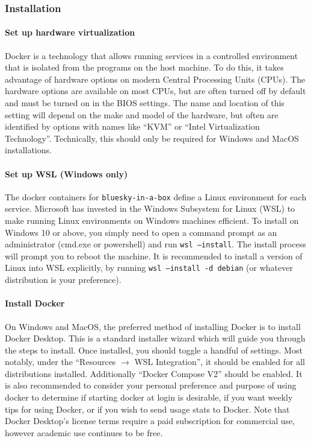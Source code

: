\subsubsection{Installation}
\label{biab-install}

\paragraph{Set up hardware virtualization}

Docker is a technology that allows running services in a controlled environment that is isolated from the programs on the host machine.
To do this, it takes advantage of hardware options on modern Central Processing Units (CPUs).
The hardware options are available on most CPUs, but are often turned off by default and must be turned on in the BIOS settings.
The name and location of this setting will depend on the make and model of the hardware, but often are identified by options with names like ``KVM'' or ``Intel Virtualization Technology''.
Technically, this should only be required for Windows and MacOS installations.

\paragraph{Set up WSL (Windows only)}

The docker containers for \texttt{bluesky-in-a-box} define a Linux\cite{} environment for each service.
Microsoft has invested in the Windows Subsystem for Linux (WSL)\cite{} to make running Linux environments on Windows machines efficient.
To install on Windows 10 or above, you simply need to open a command prompt as an administrator (cmd.exe or powershell) and run \texttt{wsl --install}.
The install process will prompt you to reboot the machine.
It is recommended to install a version of Linux into WSL explicitly, by running \texttt{wsl --install -d debian} (or whatever distribution is your preference).

\paragraph{Install Docker}

On Windows and MacOS, the preferred method of installing Docker is to install Docker Desktop\cite{}.
This is a standard installer wizard which will guide you through the steps to install.
Once installed, you should toggle a handful of settings.
Most notably, under the ``Resources $\rightarrow$ WSL Integration'', it should be enabled for all distributions installed.
Additionally ``Docker Compose V2'' should be enabled.
It is also recommended to consider your personal preference and purpose of using docker to determine if starting docker at login is desirable, if you want weekly tips for using Docker, or if you wish to send usage stats to Docker.
Note that Docker Desktop's license terms require a paid subscription for commercial use, however academic use continues to be free.

